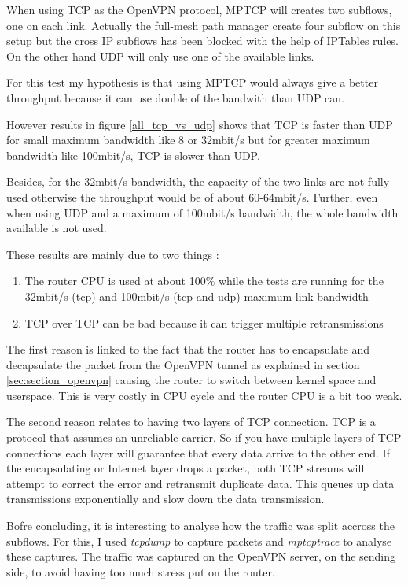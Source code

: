   When using TCP as the OpenVPN protocol, MPTCP will creates two subflows, one on each link. Actually the full-mesh path manager create four subflow on this setup
  but the cross IP subflows has been blocked with the help of IPTables rules. On the other hand UDP will only use one of the available links.

  For this test my hypothesis is that using MPTCP would always give a better throughput because it can use double of the bandwith than UDP can.

  However results in figure \ref{all_tcp_vs_udp} shows that TCP is faster than UDP for small maximum bandwidth like 8 or 32mbit/s but for greater maximum bandwidth like 100mbit/s,
  TCP is slower than UDP.

  Besides, for the 32mbit/s bandwidth, the capacity of the two links are not fully used otherwise the throughput would be of about 60-64mbit/s.
  Further, even when using UDP and a maximum of 100mbit/s bandwidth, the whole bandwidth available is not used.

  These results are mainly due to two things :
  \begin{enumerate}
    \item The router CPU is used at about 100\% while the tests are running for the 32mbit/s (tcp) and 100mbit/s (tcp and udp) maximum link bandwidth
    \item TCP over TCP can be bad because it can trigger multiple retransmissions \cite{tcpovertcp}
  \end{enumerate}

The first reason is linked to the fact that the router has to encapsulate and decapsulate the packet from the OpenVPN tunnel as explained in section \ref{sec:section_openvpn}
causing the router to switch between kernel space and
userspace. This is very costly in CPU cycle and the router CPU is a bit too weak.

The second reason relates to having two layers of TCP connection.
TCP is a protocol that assumes an unreliable carrier. So if you have multiple layers of TCP connections each layer will guarantee that every data arrive to the other end.
If the encapsulating or Internet layer drops a packet, both TCP streams will attempt to correct the error and retransmit duplicate data.
This queues up data transmissions exponentially and slow down the data transmission.

Bofre concluding, it is interesting to analyse how the traffic was split accross the subflows. For this, I used \textit{tcpdump} to capture packets and \textit{mptcptrace} to analyse these captures.
The traffic was captured on the OpenVPN server, on the sending side, to avoid having too much stress put on the router.

